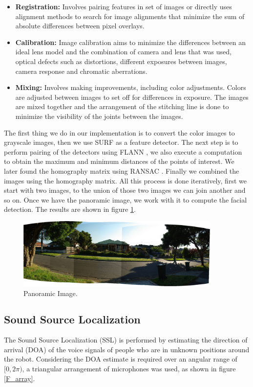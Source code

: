 \documentclass{llncs}
\begin{document}
\begin{itemize}
	\item \textbf{Registration:} Involves pairing features in set of images or directly uses alignment methods to search for image alignments that minimize the sum of absolute differences between pixel overlays.
	\item \textbf{Calibration:} Image calibration aims to minimize the differences between an ideal lens model and the combination of camera and lens that was used, optical defects such as distortions, different exposures between images, camera response and chromatic aberrations.
	\item \textbf{Mixing:} Involves making improvements, including color adjustments. Colors are adjusted between images to set off for differences in exposure. The images are mixed together and the arrangement of the stitching line is done to minimize the visibility of the joints between the images.
\end{itemize}

The first thing we do in our implementation is to convert the color images to grayscale images, then we use SURF \cite{surf} as a feature detector. The next step is to perform pairing of the detectors using FLANN \cite{flann}, we also execute a computation to obtain the maximum and minimum distances of the points of interest. We later found the homography matrix using RANSAC \cite{ransac}. Finally we combined the images using the homography matrix. All this process is done iteratively, first we start with two images, to the union of those two images we can join another and so on. Once we have the panoramic image, we work with it to compute the facial detection. The results are shown in figure \ref{pano_image}.
\begin{figure}[h]
	\centering
	\includegraphics[width=0.9\textwidth]{Figures/stitching.jpg}
	\caption{Panoramic Image.}
	\label{pano_image}
\end{figure}
 


\subsection{Sound Source Localization}\label{subsec:SoundSource}
The Sound Source Localization (SSL) is performed by estimating the direction of arrival (DOA) of the voice signals of people who are in unknown positions around the robot. Considering the DOA estimate is required over an angular range of $[0,2\pi)$, a triangular arrangement of microphones was used, as shown in figure \ref{F_array}.
\end{document}
